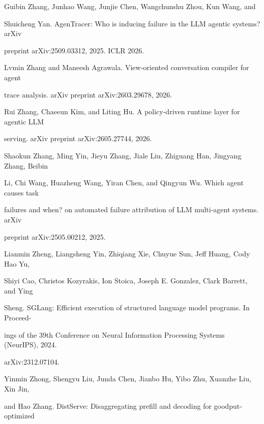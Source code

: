 \begin{flushleft}
\par\smallskip
\noindent [45] Guibin Zhang, Junhao Wang, Junjie Chen, Wangchunshu Zhou, Kun Wang, and\par
\noindent  Shuicheng Yan. AgenTracer: Who is inducing failure in the LLM agentic systems? arXiv\par
\noindent  preprint arXiv:2509.03312, 2025. ICLR 2026.\par
\par\smallskip
\noindent [46] Lvmin Zhang and Maneesh Agrawala. View-oriented conversation compiler for agent\par
\noindent  trace analysis. arXiv preprint arXiv:2603.29678, 2026.\par
\par\smallskip
\noindent [47] Rui Zhang, Chaeeun Kim, and Liting Hu. A policy-driven runtime layer for agentic LLM\par
\noindent  serving. arXiv preprint arXiv:2605.27744, 2026.\par
\par\smallskip
\noindent [48] Shaokun Zhang, Ming Yin, Jieyu Zhang, Jiale Liu, Zhiguang Han, Jingyang Zhang, Beibin\par
\noindent  Li, Chi Wang, Huazheng Wang, Yiran Chen, and Qingyun Wu. Which agent causes task\par
\noindent  failures and when? on automated failure attribution of LLM multi-agent systems. arXiv\par
\noindent  preprint arXiv:2505.00212, 2025.\par
\par\smallskip
\noindent [49] Lianmin Zheng, Liangsheng Yin, Zhiqiang Xie, Chuyue Sun, Jeff Huang, Cody Hao Yu,\par
\noindent  Shiyi Cao, Christos Kozyrakis, Ion Stoica, Joseph E. Gonzalez, Clark Barrett, and Ying\par
\noindent  Sheng. SGLang: Efficient execution of structured language model programs. In Proceed-\par
\noindent  ings of the 39th Conference on Neural Information Processing Systems (NeurIPS), 2024.\par
\noindent  arXiv:2312.07104.\par
\par\smallskip
\noindent [50] Yinmin Zhong, Shengyu Liu, Junda Chen, Jianbo Hu, Yibo Zhu, Xuanzhe Liu, Xin Jin,\par
\noindent  and Hao Zhang. DistServe: Disaggregating prefill and decoding for goodput-optimized\par

\end{flushleft}
